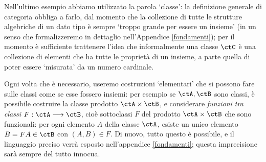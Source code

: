 Nell'ultimo esempio abbiamo utilizzato la parola `classe': la definizione generale di categoria obbliga a farlo, dal momento che la collezione di tutte le strutture algebriche di un dato tipo è sempre `troppo grande per essere un insieme' (in un senso che formalizzeremo in dettaglio nell'Appendice \ref{fondamenti}); per il momento è sufficiente trattenere l'idea che informalmente una classe $\ctC$ è una collezione di elementi che ha tutte le proprietà di un insieme, a parte quella di poter essere `misurata' da un numero cardinale.

Ogni volta che è necessario, useremo costruzioni `elementari' che si possono fare sulle classi come se esse fossero insiemi: per esempio se $\ctA,\ctB$ sono classi, è possibile costruire la classe prodotto $\ctA\times\ctB$, e considerare \emph{funzioni tra classi} $F : \ctA\fun\ctB$, cioè sottoclassi $F$ del prodotto $\ctA\times\ctB$ che sono funzionali: per ogni elemento $A$ della classe $\ctA$, esiste un unico elemento $B=FA\in\ctB$ con $(A,B)\in F$. Di nuovo, tutto questo è possibile, e il linguaggio preciso verrà esposto nell'appendice \ref{fondamenti}; questa imprecisione sarà sempre del tutto innocua.
